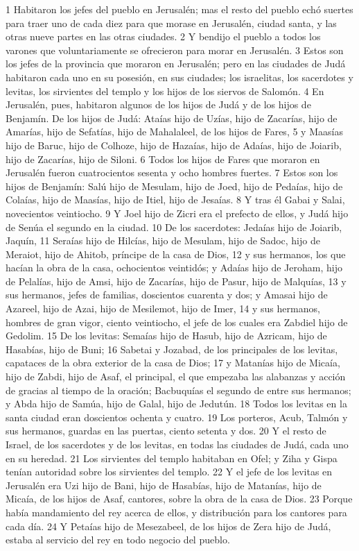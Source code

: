 1 Habitaron los jefes del pueblo en Jerusalén; mas el resto del pueblo echó suertes para traer uno de cada diez para que morase en Jerusalén, ciudad santa, y las otras nueve partes en las otras ciudades.
2 Y bendijo el pueblo a todos los varones que voluntariamente se ofrecieron para morar en Jerusalén.
3 Estos son los jefes de la provincia que moraron en Jerusalén; pero en las ciudades de Judá habitaron cada uno en su posesión, en sus ciudades; los israelitas, los sacerdotes y levitas, los sirvientes del templo y los hijos de los siervos de Salomón.
4 En Jerusalén, pues, habitaron algunos de los hijos de Judá y de los hijos de Benjamín. De los hijos de Judá: Ataías hijo de Uzías, hijo de Zacarías, hijo de Amarías, hijo de Sefatías, hijo de Mahalaleel, de los hijos de Fares,
5 y Maasías hijo de Baruc, hijo de Colhoze, hijo de Hazaías, hijo de Adaías, hijo de Joiarib, hijo de Zacarías, hijo de Siloni.
6 Todos los hijos de Fares que moraron en Jerusalén fueron cuatrocientos sesenta y ocho hombres fuertes.
7 Estos son los hijos de Benjamín: Salú hijo de Mesulam, hijo de Joed, hijo de Pedaías, hijo de Colaías, hijo de Maasías, hijo de Itiel, hijo de Jesaías.
8 Y tras él Gabai y Salai, novecientos veintiocho.
9 Y Joel hijo de Zicri era el prefecto de ellos, y Judá hijo de Senúa el segundo en la ciudad.
10 De los sacerdotes: Jedaías hijo de Joiarib, Jaquín,
11 Seraías hijo de Hilcías, hijo de Mesulam, hijo de Sadoc, hijo de Meraiot, hijo de Ahitob, príncipe de la casa de Dios,
12 y sus hermanos, los que hacían la obra de la casa, ochocientos veintidós; y Adaías hijo de Jeroham, hijo de Pelalías, hijo de Amsi, hijo de Zacarías, hijo de Pasur, hijo de Malquías,
13 y sus hermanos, jefes de familias, doscientos cuarenta y dos; y Amasai hijo de Azareel, hijo de Azai, hijo de Mesilemot, hijo de Imer,
14 y sus hermanos, hombres de gran vigor, ciento veintiocho, el jefe de los cuales era Zabdiel hijo de Gedolim.
15 De los levitas: Semaías hijo de Hasub, hijo de Azricam, hijo de Hasabías, hijo de Buni;
16 Sabetai y Jozabad, de los principales de los levitas, capataces de la obra exterior de la casa de Dios;
17 y Matanías hijo de Micaía, hijo de Zabdi, hijo de Asaf, el principal, el que empezaba las alabanzas y acción de gracias al tiempo de la oración; Bacbuquías el segundo de entre sus hermanos; y Abda hijo de Samúa, hijo de Galal, hijo de Jedutún.
18 Todos los levitas en la santa ciudad eran doscientos ochenta y cuatro.
19 Los porteros, Acub, Talmón y sus hermanos, guardas en las puertas, ciento setenta y dos. 
20 Y el resto de Israel, de los sacerdotes y de los levitas, en todas las ciudades de Judá, cada uno en su heredad.
21 Los sirvientes del templo habitaban en Ofel; y Ziha y Gispa tenían autoridad sobre los sirvientes del templo.
22 Y el jefe de los levitas en Jerusalén era Uzi hijo de Bani, hijo de Hasabías, hijo de Matanías, hijo de Micaía, de los hijos de Asaf, cantores, sobre la obra de la casa de Dios.
23 Porque había mandamiento del rey acerca de ellos, y distribución para los cantores para cada día.
24 Y Petaías hijo de Mesezabeel, de los hijos de Zera hijo de Judá, estaba al servicio del rey en todo negocio del pueblo.

